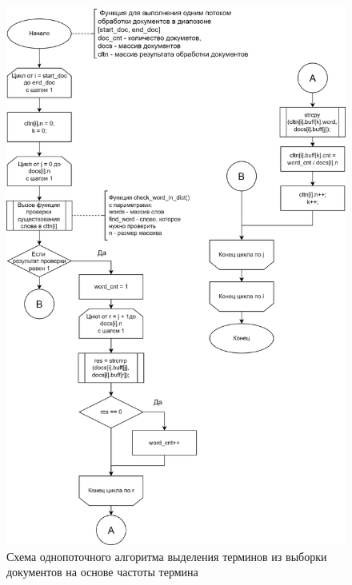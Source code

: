 \clearpage

\begin{figure}[h]
	\centering
	\includegraphics[height=0.85\textheight]{img/thread_work.png}
	\caption{Схема однопоточного алгоритма выделения терминов из выборки документов на основе частоты термина}
	\label{fig:thread_work}
\end{figure}

\clearpage

